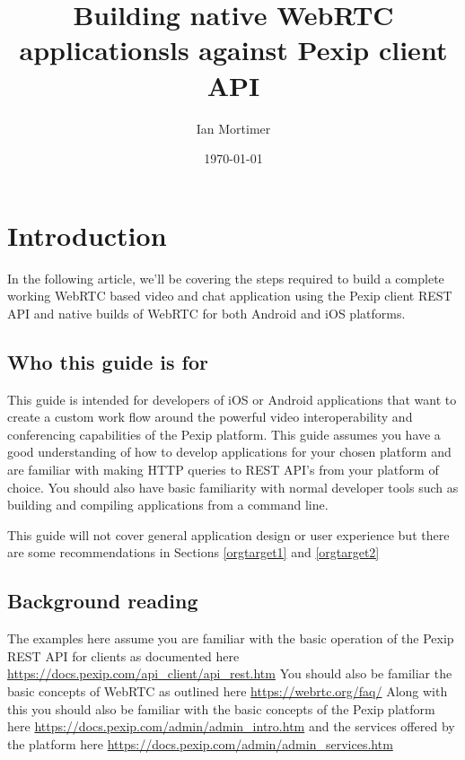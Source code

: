 \documentclass[a4paper,11pt]{article}
\author{Ian Mortimer}
\date{\today}
\title{Building native WebRTC applicationsls against Pexip client API}
\begin{document}
\maketitle
\tableofcontents

\clearpage

\section{Introduction}
\label{sec:orgheadline4}

In the following article, we'll be covering the steps required to
build a complete working WebRTC based video and chat application using
the Pexip client REST API and native builds of WebRTC for both
Android and iOS platforms.

\subsection{Who this guide is for}
\label{sec:orgheadline1}

This guide is intended for developers of iOS or Android applications
that want to create a custom work flow around the powerful video
interoperability and conferencing capabilities of the Pexip platform.
This guide assumes you have a good understanding of how to develop
applications for your chosen platform and are familiar with making
HTTP queries to REST API's from your platform of choice.  You should
also have basic familiarity with normal developer tools such as
building and compiling applications from a command line.

This guide will not cover general application design or user
experience but there are some recommendations in Sections
\ref{orgtarget1} and \ref{orgtarget2}

\subsection{Background reading}
\label{sec:orgheadline2}

The examples here assume you are familiar with the basic operation of
the Pexip REST API for clients as documented here
\url{https://docs.pexip.com/api_client/api_rest.htm} You should also be
familiar the basic concepts of WebRTC as outlined here
\url{https://webrtc.org/faq/} Along with this you should also be familiar
with the basic concepts of the Pexip platform here
\url{https://docs.pexip.com/admin/admin_intro.htm} and the services offered
by the platform here \url{https://docs.pexip.com/admin/admin_services.htm}
\end{document}
